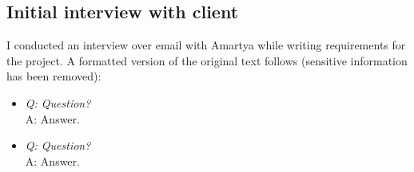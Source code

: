 \subsection{Initial interview with client}

I conducted an interview over email with Amartya while writing requirements for
the project. A formatted version of the original text follows (sensitive
information has been removed):

\newcommand{\qu}[1]{\item\textit{Q: #1 \\}}
\newcommand{\ans}[1]{A: #1}

\begin{itemize}
\qu{Question?}
\ans{Answer.}

\qu{Question?}
\ans{Answer.}
\end{itemize}
